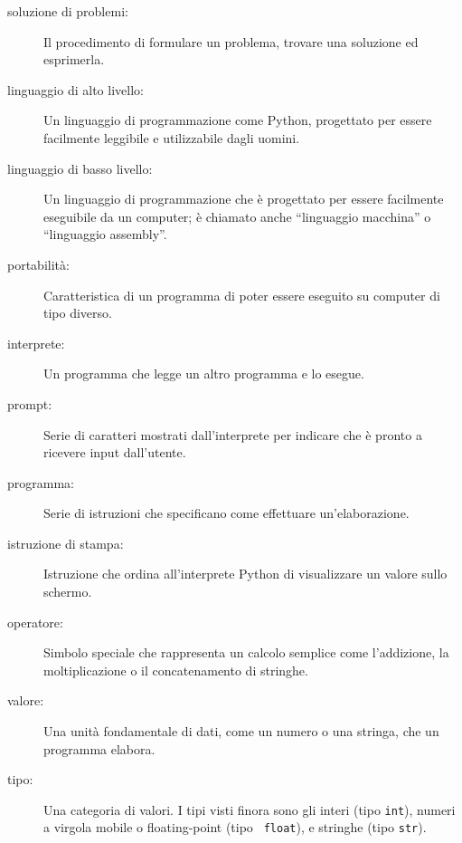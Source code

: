 \documentclass[10pt]{book}
\begin{document}
\begin{description}

\item[soluzione di problemi:]  Il procedimento di formulare un problema, trovare una soluzione ed esprimerla.

\item[linguaggio di alto livello:]  Un linguaggio di programmazione come Python, progettato per essere facilmente leggibile e utilizzabile dagli uomini.

\item[linguaggio di basso livello:]  Un linguaggio di programmazione che è progettato per essere facilmente eseguibile da un computer; è chiamato anche    ``linguaggio macchina'' o ``linguaggio assembly''.

\item[portabilità:]  Caratteristica di un programma di poter essere eseguito su computer di tipo diverso.

\item[interprete:]  Un programma che legge un altro programma e lo esegue.

\item[prompt:] Serie di caratteri mostrati dall'interprete per indicare che è pronto a ricevere input dall'utente.

\item[programma:] Serie di istruzioni che specificano come effettuare          un'elaborazione.

\item[istruzione di stampa:]  Istruzione che ordina all'interprete Python di visualizzare un valore sullo schermo.

\item[operatore:]  Simbolo speciale che rappresenta un calcolo semplice come l'addizione, la moltiplicazione o il concatenamento di stringhe.

\item[valore:]  Una unità fondamentale di dati, come un numero o una stringa, che un programma elabora.

\item[tipo:] Una categoria di valori. I tipi visti finora sono gli interi (tipo {\tt int}), numeri a virgola mobile o floating-point (tipo {\tt
float}), e stringhe (tipo {\tt str}).


\end{description}
\end{document}
